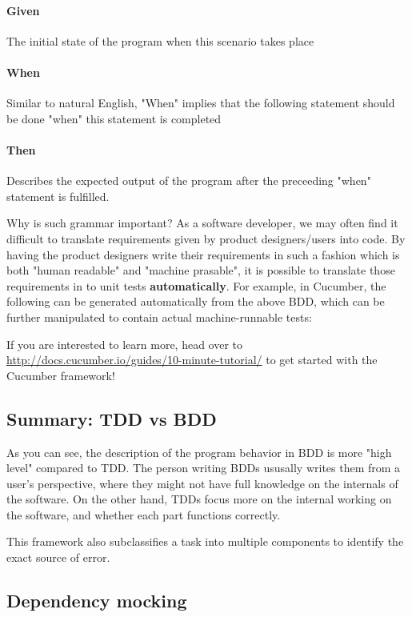 \paragraph{Given}

The initial state of the program when this scenario takes place

\paragraph{When}

Similar to natural English, "When" implies that the following statement should be done "when" this statement is completed

\paragraph{Then}

Describes the expected output of the program after the preceeding "when" statement is fulfilled. 

Why is such grammar important? As a software developer, we may often find it difficult to translate requirements given by product designers/users into code. By having the product designers write their requirements in such a fashion which is both "human readable" and "machine prasable", it is possible to translate those requirements in to unit tests \textbf{automatically}. For example, in Cucumber, the following can be generated automatically from the above BDD, which can be further manipulated to contain actual machine-runnable tests:


If you are interested to learn more, head over to \url{http://docs.cucumber.io/guides/10-minute-tutorial/} to get started with the Cucumber framework!

\subsection{Summary: TDD vs BDD}

As you can see, the description of the program behavior in BDD is more "high level" compared to TDD. The person writing BDDs ususally writes them from a user's perspective, where they might not have full knowledge on the internals of the software. On the other hand, TDDs focus more on the internal working on the software, and whether each part functions correctly. 

This framework also subclassifies a task into multiple components to identify the exact source of error.



\subsection{Dependency mocking}
